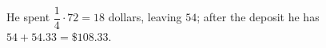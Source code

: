 He spent $\dfrac14\cdot72=18$ dollars, leaving $54$; after the deposit he has $54+54.33=\boxed{\$108.33}$.
